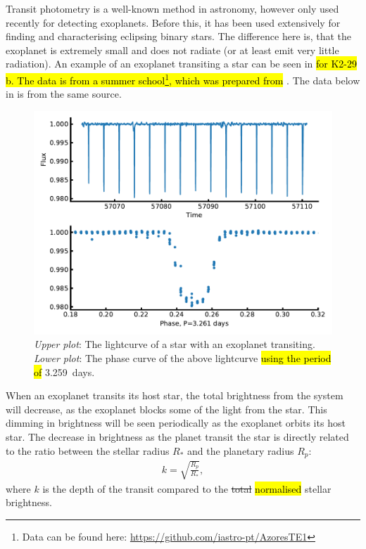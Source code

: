 Transit photometry is a well-known method in astronomy, however only used recently for detecting
exoplanets. Before this, it has been used extensively for finding and characterising eclipsing
binary stars. The difference here is, that the exoplanet is extremely small and does not radiate (or
at least emit very little radiation). An example of an exoplanet transiting a star can be seen in
 \hl{for K2-29 b. The data is from a summer school\footnote{Data can be
found here: \url{https://github.com/iastro-pt/AzoresTE1}}, which was prepared from}
\citet{Santerne2016}. The data below in  is from the same source.

\begin{figure}[htpb!]
    \centering
    \includegraphics[width=1.0\linewidth]{figures/transitMethod.pdf}
    \caption{\emph{Upper plot}: The lightcurve of a star with an exoplanet transiting.
             \emph{Lower plot}: The phase curve of the above lightcurve \hl{using the period of}
             \SI{3.259}{days}.}
    \label{fig:transitMethod}
\end{figure}

When an exoplanet transits its host star, the total brightness from the system will decrease, as the
exoplanet blocks some of the light from the star. This dimming in brightness will be seen
periodically as the exoplanet orbits its host star. The decrease in brightness as the planet transit
the star is directly related to the ratio between the stellar radius $R_\ast$ and the planetary
radius $R_p$:
\begin{align}
  k = \sqrt{\frac{R_p}{R_\ast}},  \label{eq:transit}
\end{align}
where $k$ is the depth of the transit compared to the \st{total} \hl{normalised} stellar brightness.

